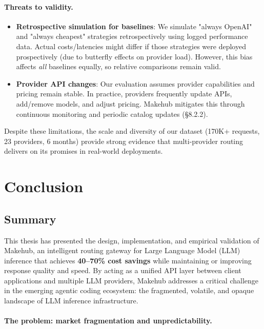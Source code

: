 \documentclass[english]{article}
\begin{document}
\paragraph{Threats to validity.}

\begin{itemize}
\item \textbf{Retrospective simulation for baselines}: We simulate "always OpenAI" and "always cheapest" strategies retrospectively using logged performance data. Actual costs/latencies might differ if those strategies were deployed prospectively (due to butterfly effects on provider load). However, this bias affects \emph{all} baselines equally, so relative comparisons remain valid.

\item \textbf{Provider API changes}: Our evaluation assumes provider capabilities and pricing remain stable. In practice, providers frequently update APIs, add/remove models, and adjust pricing. Makehub mitigates this through continuous monitoring and periodic catalog updates (§8.2.2).
\end{itemize}

Despite these limitations, the scale and diversity of our dataset (170K+ requests, 23 providers, 6 months) provide strong evidence that multi-provider routing delivers on its promises in real-world deployments.


\newpage
\section{Conclusion}

\subsection{Summary}

This thesis has presented the design, implementation, and empirical validation of Makehub, an intelligent routing gateway for Large Language Model (LLM) inference that achieves \textbf{40--70\% cost savings} while maintaining or improving response quality and speed. By acting as a unified API layer between client applications and multiple LLM providers, Makehub addresses a critical challenge in the emerging agentic coding ecosystem: the fragmented, volatile, and opaque landscape of LLM inference infrastructure.

\paragraph{The problem: market fragmentation and unpredictability.}
\end{document}
